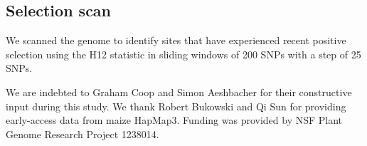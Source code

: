 \documentclass{pnastwo}
\begin{document}
\begin{article}
\begin{materials}
\subsection{Selection scan}
We scanned the genome to identify sites that have experienced recent positive selection using the H12 statistic \cite{garud2015} in sliding windows of 200 SNPs with a step of 25 SNPs.

\end{materials}

\begin{acknowledgments}
We are indebted to Graham Coop and Simon Aeshbacher for their constructive input during this study. We thank Robert Bukowski and Qi Sun for providing early-access data from maize HapMap3. Funding was provided by NSF Plant Genome Research Project 1238014.
\end{acknowledgments}



\onecolumn
 


\end{article}
\end{document}
